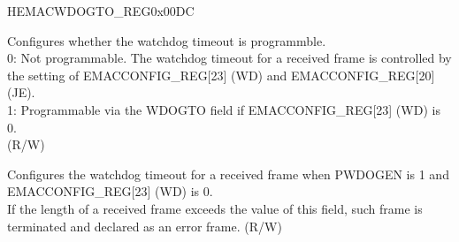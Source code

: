 \begin{register}{H}{EMACWDOGTO\_REG}{0x00DC}\label{regdesc:EMACWDOGTOREG}
%
%
%
%
\regnewline%
\begin{regdesc}\begin{reglist}
\item [PWDOGEN] Configures whether the watchdog timeout is programmble.\\
0: Not programmable. The watchdog timeout for a received frame is controlled by the setting of EMACCONFIG\_REG[23] (WD) and EMACCONFIG\_REG[20] (JE).\\
1: Programmable via the WDOGTO field if EMACCONFIG\_REG[23] (WD) is 0.\\ (R/W)
\item [WDOGTO] Configures the watchdog timeout for a received frame when PWDOGEN is 1 and EMACCONFIG\_REG[23] (WD) is 0.\\
If the length of a received frame exceeds the value of this field, such frame is terminated and declared as an error frame. (R/W)
\end{reglist}\end{regdesc}
\end{register}


